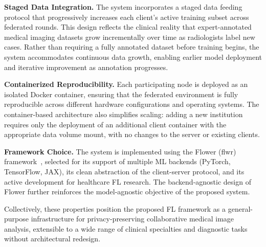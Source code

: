 \textbf{Staged Data Integration.} The system incorporates a staged data
feeding protocol that progressively increases each client's active training
subset across federated rounds. This design reflects the clinical reality
that expert-annotated medical imaging datasets grow incrementally over time
as radiologists label new cases. Rather than requiring a fully annotated
dataset before training begins, the system accommodates continuous data
growth, enabling earlier model deployment and iterative improvement as
annotation progresses.
 
\textbf{Containerized Reproducibility.} Each participating node is deployed
as an isolated Docker container, ensuring that the federated environment is
fully reproducible across different hardware configurations and operating
systems. The container-based architecture also simplifies scaling: adding a
new institution requires only the deployment of an additional client
container with the appropriate data volume mount, with no changes to the
server or existing clients.
 
\textbf{Framework Choice.} The system is implemented using the Flower
(flwr) framework~\cite{beutel2022}, selected for its support of multiple
ML backends (PyTorch, TensorFlow, JAX), its clean abstraction of the
client-server protocol, and its active development for healthcare FL
research. The backend-agnostic design of Flower further reinforces the
model-agnostic objective of the proposed system.
 
Collectively, these properties position the proposed FL framework as a
general-purpose infrastructure for privacy-preserving collaborative medical
image analysis, extensible to a wide range of clinical specialties and
diagnostic tasks without architectural redesign.
